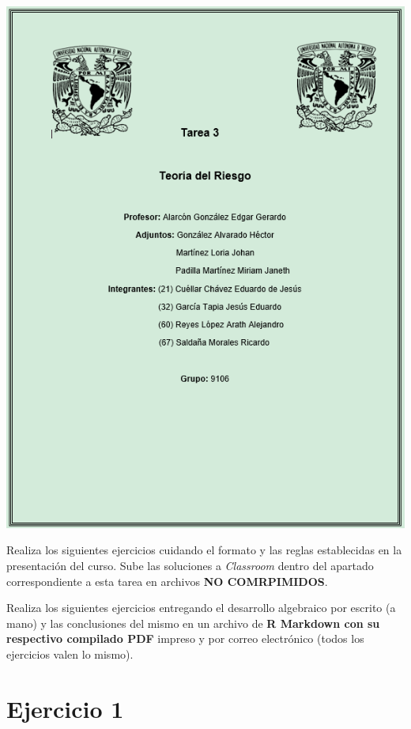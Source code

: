 \documentclass[
]{article}
\author{}
\date{\vspace{-2.5em}}
\begin{document}
\begin{center}\includegraphics[width=2.4\linewidth]{CARATULA} \end{center}
\newpage

Realiza los siguientes ejercicios cuidando el formato y las reglas
establecidas en la presentación del curso. Sube las soluciones a
\emph{Classroom} dentro del apartado correspondiente a esta tarea en
archivos \textbf{NO COMRPIMIDOS}.

Realiza los siguientes ejercicios entregando el desarrollo algebraico
por escrito (a mano) y las conclusiones del mismo en un archivo de
\textbf{R Markdown con su respectivo compilado PDF} impreso y por correo
electrónico (todos los ejercicios valen lo mismo).

\hypertarget{ejercicio-1}{%
\section{Ejercicio 1}\label{ejercicio-1}}
\end{document}
